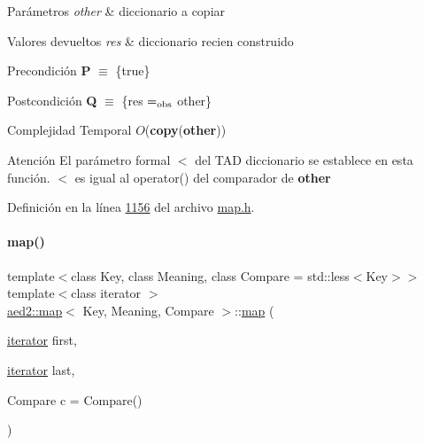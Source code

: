 \begin{DoxyParams}{Parámetros}
{\em other} & diccionario a copiar \\
\hline
\end{DoxyParams}

\begin{DoxyRetVals}{Valores devueltos}
{\em res} & diccionario recien construido\\
\hline
\end{DoxyRetVals}
\begin{DoxyPrecond}{Precondición}
{\bfseries P} $\equiv$ \{true\} 
\end{DoxyPrecond}
\begin{DoxyPostcond}{Postcondición}
{\bfseries Q} $\equiv$ \{res $=_{\rm obs}$ other\}
\end{DoxyPostcond}

\begin{DoxyDescription}
\item[Complejidad Temporal]$O$({\bfseries copy}({\bfseries other}))
\end{DoxyDescription}

\begin{DoxyAttention}{Atención}
El parámetro formal $<$ del T\+AD diccionario se establece en esta función. $<$ es igual al operator() del comparador de {\bfseries other} 
\end{DoxyAttention}


Definición en la línea \hyperlink{map_8h_source_l01156}{1156} del archivo \hyperlink{map_8h_source}{map.\+h}.

\mbox{\label{classaed2_1_1map_a5d336f3248572beb56be383dcc95cfeb_a5d336f3248572beb56be383dcc95cfeb}} 
\paragraph{\texorpdfstring{map()}{map()}\hspace{0.1cm}{\footnotesize\ttfamily [3/3]}}
{\footnotesize\ttfamily template$<$class Key, class Meaning, class Compare = std\+::less$<$\+Key$>$$>$ \\
template$<$class iterator $>$ \\
\hyperlink{classaed2_1_1map}{aed2\+::map}$<$ Key, Meaning, Compare $>$\+::\hyperlink{classaed2_1_1map}{map} (\begin{DoxyParamCaption}\item[{\hyperlink{classaed2_1_1map_1_1iterator}{iterator}}]{first,  }\item[{\hyperlink{classaed2_1_1map_1_1iterator}{iterator}}]{last,  }\item[{Compare}]{c = {\ttfamily Compare()} }\end{DoxyParamCaption})\hspace{0.3cm}{\ttfamily [inline]}}




